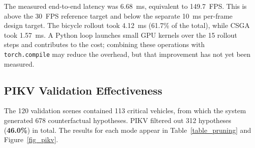 The measured end-to-end latency was 6.68~ms, equivalent to 149.7~FPS. This is above the 30~FPS reference target and below the separate 10~ms per-frame design target. The bicycle rollout took 4.12~ms (61.7\% of the total), while CSGA took 1.57~ms. A Python loop launches small GPU kernels over the 15 rollout steps and contributes to the cost; combining these operations with \texttt{torch.compile} may reduce the overhead, but that improvement has not yet been measured.

\subsection{PIKV Validation Effectiveness}
The 120 validation scenes contained 113 critical vehicles, from which the system generated 678 counterfactual hypotheses. PIKV filtered out 312 hypotheses (\textbf{46.0\%}) in total. The results for each mode appear in Table~\ref{table_pruning} and Figure~\ref{fig_pikv}.

\begin{table}[H]
\caption{PIKV hypothesis pruning across the six counterfactual modes (678 hypotheses, 113 per mode, from real traffic validation samples).}
\label{table_pruning}
\centering
{}
\end{table}

